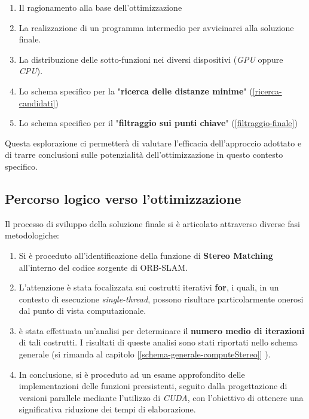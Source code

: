 \documentclass[12pt,a4paper]{report}
\begin{document}
\begin{enumerate}
    \item Il ragionamento alla base dell'ottimizzazione
    \item La realizzazione di un programma intermedio per avvicinarci alla soluzione finale.
    \item La distribuzione delle sotto-funzioni nei diversi dispositivi (\textit{GPU} oppure \textit{CPU}).
    \item Lo schema specifico per la "\textbf{ricerca delle distanze minime}" (\ref{ricerca-candidati})
    \item Lo schema specifico per il "\textbf{filtraggio sui punti chiave}" (\ref{filtraggio-finale})
\end{enumerate}

Questa esplorazione ci permetterà di valutare l'efficacia dell'approccio adottato e di trarre conclusioni sulle potenzialità dell'ottimizzazione in questo contesto specifico.

\subsection{Percorso logico verso l'ottimizzazione}

Il processo di sviluppo della soluzione finale si è articolato attraverso diverse fasi metodologiche:

\begin{enumerate}
    \item  Si è proceduto all'identificazione della funzione di \textbf{Stereo Matching} all'interno del codice sorgente di ORB-SLAM.
    \item L'attenzione è stata focalizzata sui costrutti iterativi \textbf{for}, i quali, in un contesto di esecuzione \textit{single-thread}, possono risultare particolarmente onerosi dal punto di vista computazionale.
    \item è stata effettuata un'analisi per determinare il \textbf{numero medio di iterazioni} di tali costrutti. I risultati di queste analisi sono stati riportati nello schema generale (si rimanda al capitolo [\ref{schema-generale-computeStereo}] ).
    \item In conclusione, si è proceduto ad un esame approfondito delle implementazioni delle funzioni preesistenti, seguito dalla progettazione di versioni parallele mediante l'utilizzo di \textit{CUDA}, con l'obiettivo di ottenere una significativa riduzione dei tempi di elaborazione.
\end{enumerate}
\end{document}
